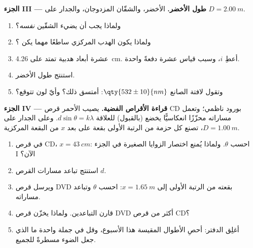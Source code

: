 \begin{problem}
\medskip
\noindent\textbf{الجزء III --- طول   الأخضر.} 
الأخضر، والشقّان المزدوجان، والجدار على $D = \qty{2.00}{m}$.
\begin{enumerate}[resume]
  \item ولماذا يجب أن يضيء الشقّين \emph{ نفسه}؟
  \item ولماذا يكون الهدب المركزي ساطعًا مهما يكن ؟
  \item عشرة أبعاد هدبية تمتد على \qty{4.26}{cm}. أعطِ $i$، وسبب
        قياس عشرة دفعةً واحدة.
  \item استنتج طول   الأخضر.
  \item وتقول لافتة الصانع $\qty{532 \pm 10}{nm}$: أمتسق ذلك؟
        وأيّ لون تتوقع؟
\end{enumerate}

\medskip
\noindent\textbf{الجزء IV --- قراءة الأقراص الفضية.} يصيب  الأحمر
قرص CD بورود ناظمي؛ وتعمل مساراته محزّزًا انعكاسيًّا
يخضع (بالقبول) للعلاقة $d \sin\theta = k\lambda$. وعلى الجدار على $D =
\qty{1.00}{m}$، تصنع كل حزمة من الرتبة الأولى بقعة على بعد $x$ من
البقعة المركزية.
\begin{enumerate}[resume]
  \item في قرص CD، $x = \qty{43}{cm}$: احسب $\theta$. ولماذا يُمنع
        اختصار الزوايا الصغيرة في الجزء I الآن؟
  \item استنتج تباعد مسارات القرص $d$.
  \item ويرسل قرص DVD بقعته من الرتبة الأولى إلى $x = \qty{1.65}{m}$:
        احسب $\theta$ وتباعد مساراته.
  \item قارن التباعدين. ولماذا يخزّن قرص DVD أكثر من قرص CD؟
  \item أغلِق الدفتر: أحصِ الأطوال المقيسة هذا الأسبوع،
        وقل في جملة واحدة ما الذي جعل الضوء مسطرةً للجميع.
\end{enumerate}
\end{problem}
